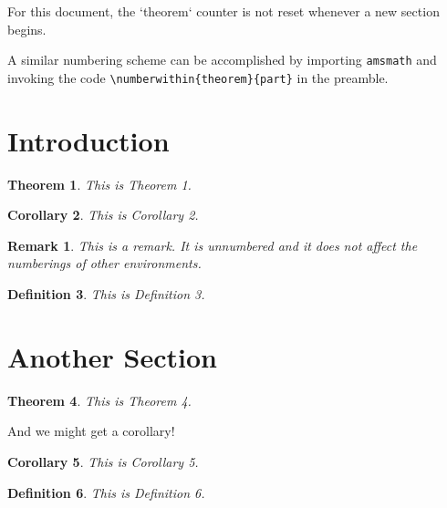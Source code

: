 \documentclass{article}
\newtheorem{theorem}{Theorem}
\newtheorem{corollary}[theorem]{Corollary}
\newtheorem{definition}[theorem]{Definition}
\newtheorem*{remark*}{Remark}
\begin{document}
For this document, the `theorem` counter is not reset whenever a new section begins.

A similar numbering scheme can be accomplished by importing \verb|amsmath| and invoking the code \verb|\numberwithin{theorem}{part}| in the preamble.

\section{Introduction}

\begin{theorem}
This is Theorem 1.
\end{theorem}

\begin{corollary}
This is Corollary 2.
\end{corollary}

\begin{remark*}
This is a remark. It is unnumbered and it does not affect the numberings of other environments.
\end{remark*}

\begin{definition}
This is Definition 3.
\end{definition}



\section{Another Section}

\begin{theorem}
This is Theorem 4.
\end{theorem}

And we might get a corollary!

\begin{corollary}
This is Corollary 5.
\end{corollary}

\begin{definition}
This is Definition 6.
\end{definition}
\end{document}
